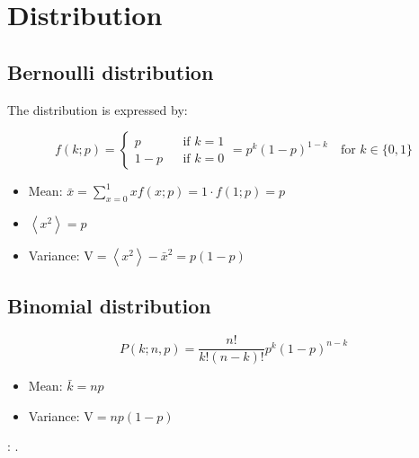 

\section{Distribution}
\label{sec:distr}

\subsection{Bernoulli distribution}
\label{subsec:Bernoulli_distr}

The distribution is expressed by:

\begin{equation}\label{eq:Bernoulli_distr}
	f(k ; p) = \left\{
	\begin{array}{lcl}
		p     & & {\textrm{if } k = 1}\\
		1 - p & & {\textrm{if } k = 0}
	\end{array} \right.
	= p^{k}(1-p)^{1 - k} \quad \textrm{for } k \in \{ 0, 1 \}
\end{equation}

\begin{itemize}
	\item Mean: $\bar{x} = \sum_{x = 0}^{1} {x f(x ; p)}  = 1 \cdot f(1 ; p) = p$
	\item $\left \langle x^{2} \right \rangle = p$
	\item Variance: $\mathrm{V} = \left \langle x^{2} \right \rangle - {\bar{x}}^{2} = p(1 - p)$
\end{itemize}

\subsection{Binomial distribution}
\label{subsec:binomial_distr}

\begin{equation}\label{eq:binomial_distr}
	P(k ; n, p) = \frac{n!}{k!(n-k)!} p^{k}(1-p)^{n - k}
\end{equation}

\begin{itemize}
	\item Mean: $\bar{k} = np$
	\item Variance: $\mathrm{V} = np(1 - p)$
\end{itemize}

: .

